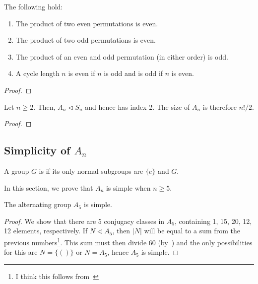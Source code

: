 \begin{lemma}
  The following hold:
  \begin{enumerate}
  \item The product of two even permutations is even.
  \item The product of two odd permutations is even.
  \item The product of an even and odd permutation (in either order) is odd.
  \item A cycle length \(n\) is even if \(n\) is odd and is odd if \(n\) is even.
  \end{enumerate}
\end{lemma}
\begin{proof}
\end{proof}

\begin{theorem}
  Let \(n \geq 2\). Then, \(A_{n} \triangleleft S_{n}\) and hence has index 2. The size of \(A_{n}\) is therefore \(n! / 2\).
\end{theorem}

\begin{proof}
\end{proof}


\subsection{Simplicity of \(A_{n}\)}

\begin{definition}
  A group \(G\) is  if its only normal subgroups are \(\{e\}\) and \(G\).
\end{definition}

In this section, we prove that \(A_{n}\) is simple when \(n \geq 5\).

\begin{theorem}\label{thm:group-theory:A5-is-simple}
  The alternating group \(A_{5}\) is simple.
\end{theorem}

\begin{proof}
  We show that there are 5 conjugacy classes in \(A_{5}\), containing 1, 15, 20, 12, 12 elements, respectively. If \(N \triangleleft A_{5}\), then \(|N|\) will be equal to a sum from the previous numbers\footnote{I think this follows from~}. This sum must then divide 60 (by~) and the only possibilities for this are \(N = \{()\}\) or \(N = A_{5}\), hence \(A_{5}\) is simple.
\end{proof}

